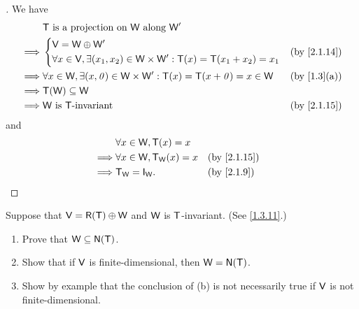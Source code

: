 \begin{proof}[]
  We have
  \begin{align*}
             & \T \text{ is a projection on } \W \text{ along } \W'                                                   \\
    \implies & \begin{dcases}
                 \V = \W \oplus \W' \\
                 \forall x \in \V, \exists (x_1, x_2) \in \W \times \W' : \T(x) = \T(x_1 + x_2) = x_1
               \end{dcases}  &  & \by{2.1.14}                    \\
    \implies & \forall x \in \W, \exists (x, \zv) \in \W \times \W' : \T(x) = \T(x + \zv) = x \in \W &  & \by{1.3}[a] \\
    \implies & \T(\W) \subseteq \W                                                                                    \\
    \implies & \W \text{ is } \T\text{-invariant}                                                    &  & \by{2.1.15}
  \end{align*}
  and
  \begin{align*}
             & \forall x \in \W, \T(x) = x                       \\
    \implies & \forall x \in \W, \T_{\W}(x) = x &  & \by{2.1.15} \\
    \implies & \T_{\W} = \IT[\W].               &  & \by{2.1.9}
  \end{align*}
\end{proof}

\begin{ex}\label{ex:2.1.31}
  Suppose that \(\V = \rg{\T} \oplus \W\) and \(\mathsf{W}\) is \(\mathsf{T}\)-invariant.
  (See \cref{1.3.11}.)
  \begin{enumerate}
    \item Prove that \(\W \subseteq \ns{\T}\).
    \item Show that if \(\mathsf{V}\) is finite-dimensional, then \(\W = \ns{\T}\).
    \item Show by example that the conclusion of (b) is not necessarily true if \(\mathsf{V}\) is not finite-dimensional.
  \end{enumerate}
\end{ex}

